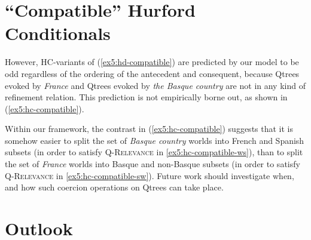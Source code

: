 \begin{exe}
	\ex 
	\begin{xlist}
		\label{ex5:ldhd-s-w}
		\label{ex5:ldhd-w-s}
	\end{xlist}
\end{exe}

\section{``Compatible'' Hurford Conditionals}
However, HC-variants of (\ref{ex5:hd-compatible}) are predicted by our model to be odd regardless of the ordering of the antecedent and consequent, because Qtrees evoked by \textit{France} and Qtrees evoked by \textit{the Basque country} are not in any kind of refinement relation. This prediction is not empirically borne out, as shown in (\ref{ex5:hc-compatible}).

\begin{exe}
	\ex \label{ex5:hc-compatible}
	\begin{xlist}
		\label{ex5:hc-compatible-ws}
		\label{ex5:hc-compatible-sw}
	\end{xlist}
\end{exe}

Within our framework, the contrast in (\ref{ex5:hc-compatible}) suggests that it is somehow easier to split the set of \textit{Basque country} worlds into French and Spanish subsets (in order to satisfy \textsc{Q-Relevance} in \ref{ex5:hc-compatible-ws}), than to split the set of \textit{France} worlds into Basque and non-Basque subsets (in order to satisfy \textsc{Q-Relevance} in \ref{ex5:hc-compatible-sw}). Future work should investigate when, and how such coercion operations on Qtrees can take place.\\


\section{Outlook}

